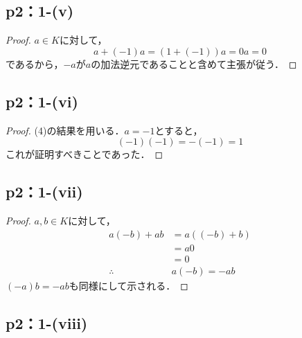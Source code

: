 \documentclass[a4paper,10pt,fleqn]{ltjsarticle}
\begin{document}
\subsection*{p2：1-(v)}
\begin{leftbar}
    \begin{proof}
        $a \in K$に対して，
        \[
            a+(-1)a=(1+(-1))a =0a =0
        \]
        であるから，$-a$が$a$の加法逆元であることと含めて主張が従う．
    \end{proof}
\end{leftbar}

\newpage

\subsection*{p2：1-(vi)}
\begin{leftbar}
    \begin{proof}
        (4)の結果を用いる．$a=-1$とすると，
        \[
            (-1)(-1)=-(-1)=1
        \]
        これが証明すべきことであった．
    \end{proof}
\end{leftbar}
\subsection*{p2：1-(vii)}

\begin{leftbar}
    \begin{proof}
        $a,b \in K$に対して，
        \begin{align*}
            a(-b)+ab         & = a((-b)+b) \\
                             & = a0        \\
                             & =0          \\
            \therefore \quad & a(-b)=-ab
        \end{align*}
        $(-a)b = -ab$も同様にして示される．
    \end{proof}
\end{leftbar}

\subsection*{p2：1-(viii)}
\end{document}
